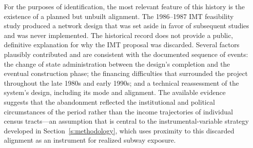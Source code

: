 For the purposes of identification, the most relevant feature of this history is the existence of a planned but unbuilt alignment. The 1986--1987 IMT feasibility study produced a network design that was set aside in favor of subsequent studies and was never implemented. The historical record does not provide a public, definitive explanation for why the IMT proposal was discarded. Several factors plausibly contributed and are consistent with the documented sequence of events: the change of state administration between the design's completion and the eventual construction phase; the financing difficulties that surrounded the project throughout the late 1980s and early 1990s; and a technical reassessment of the system's design, including its mode and alignment. The available evidence suggests that the abandonment reflected the institutional and political circumstances of the period rather than the income trajectories of individual census tracts---an assumption that is central to the instrumental-variable strategy developed in Section~\ref{s:methodology}, which uses proximity to this discarded alignment as an instrument for realized subway exposure.